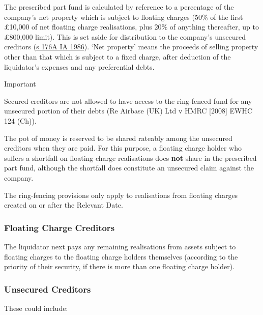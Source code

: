 \documentclass[
]{article}
\newenvironment{env-26bb6fb1-abd0-489e-8e80-3f170ecd0052}
{
    \savenotes\tcolorbox[blanker,breakable,left=5pt,borderline west={2pt}{-4pt}{cyan}]
}
{
    \endtcolorbox\spewnotes
}
\begin{document}
The prescribed part fund is calculated by reference to a percentage of
the company's net property which is subject to floating charges (50\% of
the first £10,000 of net floating charge realisations, plus 20\% of
anything thereafter, up to £800,000 limit). This is set aside for
distribution to the company's unsecured creditors
(\href{https://www.legislation.gov.uk/ukpga/1986/45/section/176}{s 176A
IA 1986}). `Net property' means the proceeds of selling property other
than that which is subject to a fixed charge, after deduction of the
liquidator's expenses and any preferential debts.

\begin{env-26bb6fb1-abd0-489e-8e80-3f170ecd0052}

Important

Secured creditors are not allowed to have access to the ring-fenced fund
for any unsecured portion of their debts (Re Airbase (UK) Ltd v HMRC
{[}2008{]} EWHC 124 (Ch)).

\end{env-26bb6fb1-abd0-489e-8e80-3f170ecd0052}

The pot of money is reserved to be shared rateably among the unsecured
creditors when they are paid. For this purpose, a floating charge holder
who suffers a shortfall on floating charge realisations does
\textbf{not} share in the prescribed part fund, although the shortfall
does constitute an unsecured claim against the company.

The ring-fencing provisions only apply to realisations from floating
charges created on or after the Relevant Date.

\hypertarget{floating-charge-creditors}{%
\subsubsection{Floating Charge
Creditors}\label{floating-charge-creditors}}

The liquidator next pays any remaining realisations from assets subject
to floating charges to the floating charge holders themselves (according
to the priority of their security, if there is more than one floating
charge holder).

\hypertarget{unsecured-creditors}{%
\subsubsection{Unsecured Creditors}\label{unsecured-creditors}}

These could include:
\end{document}
